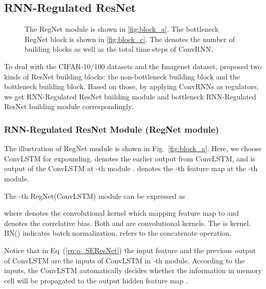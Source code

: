 \documentclass[journal,comsoc]{IEEEtran}
\begin{document}
\subsection{RNN-Regulated ResNet}



\begin{figure}[tbp] 
  \centering 
  \quad 
  \caption{The RegNet module is shown in \ref{fig:block_a}. The bottleneck RegNet block is shown in \ref{fig:block_c}. The  denotes the number of building blocks as well as the total time steps of ConvRNN. }
\label{fig:block}
\end{figure}







To deal with the CIFAR-10/100 datasets and the Imagenet dataset, \cite{DBLP:journals/corr/HeZRS15} proposed two kinds of ResNet building blocks: the non-bottleneck building block and the bottleneck building block. Based on those, by applying ConvRNNs as regulators, we get RNN-Regulated ResNet building module and bottleneck RNN-Regulated ResNet building module correspondingly. 






\subsubsection{RNN-Regulated ResNet Module (RegNet module)}
The illustration of RegNet module is shown in Fig.~\ref{fig:block_a}. Here, we choose ConvLSTM for expounding.  denotes the earlier output from ConvLSTM, and  is output of the ConvLSTM at -th module .   denotes the -th feature map at the -th module. 

The -th RegNet(ConvLSTM) module can be expressed as

where  denotes the convolutional kernel which mapping feature map  to  and  denotes the correlative bias. Both  and  are  convolutional kernels. The  is  kernel. BN() indicates batch normalization.  refers to the concatenate operation.

Notice that in Eq~(\ref{eq:o_SEResNet}) the input feature  and the previous output of ConvLSTM  are the inputs of ConvLSTM in -th module. 
According to the inputs, the ConvLSTM automatically decides 
whether the information in memory cell will be propagated to the output hidden feature map .
\end{document}
